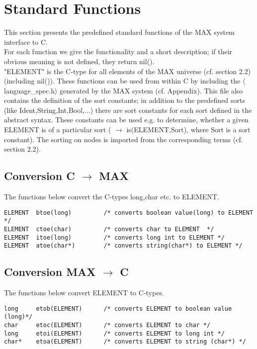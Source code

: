 \section{Standard Functions}
This section presents the predefined standard functions of the MAX system interface to C.\\
For each function we give the functionality and a short description; if their obvious meaning is not defined, they return nil().\\
"ELEMENT" is the C-type for all elements of the MAX universe (cf. section 2.2) (including nil()). These functions can be used from within C by including the $\langle$language\_spec.h$\rangle$ generated by the MAX system (cf. Appendix). This file also contains the definition of the sort constants; in addition to
 the predefined sorts (like Ident,String,Int,Bool,...) there are sort constants for each sort defined in the 
abstract syntax. These constants can be used e.g. to determine, whether a given ELEMENT is of a particular sort
( $\rightarrow$ is(ELEMENT,Sort), where Sort is a sort constant). The sorting on nodes is imported from the corresponding terms (cf. section 2.2).\\
\subsection{Conversion C $\rightarrow$ MAX}
The functions below convert the C-types long,char etc. to ELEMENT.
\begin{verbatim}
ELEMENT  btoe(long)         /* converts boolean value(long) to ELEMENT */       
ELEMENT  ctoe(char)         /* converts char to ELEMENT  */
ELEMENT  itoe(long)         /* converts long int to ELEMENT */
ELEMENT  atoe(char*)        /* converts string(char*) to ELEMENT */
\end{verbatim}
       
\subsection{Conversion MAX $\rightarrow$ C}
The functions below convert ELEMENT to C-types.
\begin{verbatim}
long     etob(ELEMENT)      /* converts ELEMENT to boolean value (long)*/
char     etoc(ELEMENT)      /* converts ELEMENT to char */
long     etoi(ELEMENT)      /* converts ELEMENT to long int */ 
char*    etoa(ELEMENT)      /* converts ELEMENT to string (char*) */
\end{verbatim}
       
